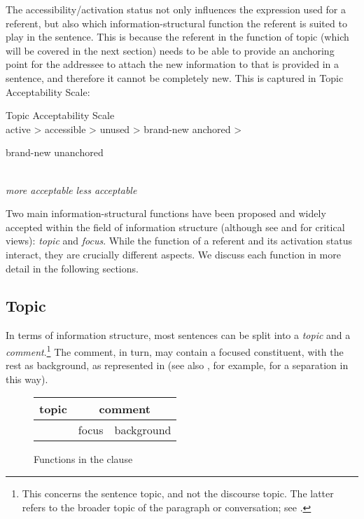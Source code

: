 \documentclass[output=paper]{langscibook}
\begin{document}
The accessibility/activation status not only influences the expression used for a referent, but also which information-structural function the referent is suited to play in the sentence. This is because the referent in the function of topic (which will be covered in the next section) needs to be able to provide an anchoring point for the addressee to attach the new information to that is provided in a sentence, and therefore it cannot be completely new. This is captured in  Topic Acceptability Scale:

\ea
Topic Acceptability Scale \citep[165]{Lambrecht1994}\\
\newlength{\introscalebwidth}
\settowidth{\introscalebwidth}{ unanchored}
\mbox active > accessible > unused > brand-new anchored > \parbox[t][2.5\baselineskip]{\introscalebwidth}{brand-new unanchored}\\
\textit{more acceptable} \hfill  \textit{less acceptable}
\z

Two main information-structural functions have been proposed and widely accepted within the field of information structure (although see \citealt{MatićWedgwood2013} and \citealt{Ozerov2018,Ozerov2021} for critical views): \textit{topic} and \textit{focus}. While the function of a referent and its activation status interact, they are crucially different aspects. We discuss each function in more detail in the following sections.

\subsection{Topic}

In terms of information structure, most sentences can be split into a \textit{topic} and a \textit{comment}.\footnote{This concerns the sentence topic, and not the discourse topic. The latter refers to the broader topic of the paragraph or conversation; see \citet{Lambrecht1994}.} The comment, in turn, may contain a focused constituent, with the rest as background, as represented in  (see also \citealt{NeelemanEtAl2009}, for example, for a separation in this way).


\begin{figure}
\begin{tabular}{c c |c|}
\hline
\multicolumn{1}{|c}{topic} & \multicolumn{2}{|c|}{comment}\\
\hline
& \multicolumn{1}{|c|}{focus} & background\\
\cline{2-3}
\end{tabular}
\caption{Functions in the clause}
\label{fig:clausefunx}
\end{figure}
\end{document}
